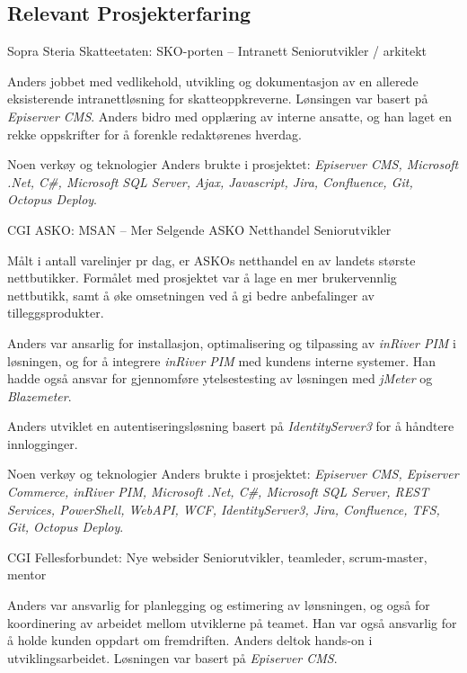 \documentclass[10pt]{article} %
\begin{document}
\begin{paracol}{2}

\section{Relevant Prosjekterfaring}


{Sopra Steria} %
{Skatteetaten: SKO-porten -- Intranett} 
{Seniorutvikler / arkitekt} 
{Anders jobbet med vedlikehold, utvikling og dokumentasjon av en allerede eksisterende intranettløsning for skatteoppkreverne. Lønsingen var basert på \textit{Episerver CMS}. Anders bidro med opplæring av interne ansatte, og han laget en rekke oppskrifter for å forenkle redaktørenes hverdag.

\qquad Noen verkøy og teknologier Anders brukte i prosjektet: \textit{Episerver CMS, Microsoft .Net, C\#, Microsoft SQL Server, Ajax, Javascript, Jira, Confluence, Git, Octopus Deploy}.} 

{CGI} %
{ASKO: MSAN -- Mer Selgende ASKO Netthandel} 
{Seniorutvikler} 
{Målt i antall varelinjer pr dag, er ASKOs netthandel en av landets største nettbutikker. Formålet med prosjektet var å lage en mer brukervennlig nettbutikk, samt å øke omsetningen ved å gi bedre anbefalinger av tilleggsprodukter.

\qquad Anders var ansarlig for installasjon, optimalisering og tilpassing av \textit{inRiver PIM} i løsningen, og for å integrere 
\textit{inRiver PIM} med kundens interne systemer. Han hadde også ansvar for gjennomføre ytelsestesting av løsningen 
med \textit{jMeter} og  \textit{Blazemeter}.

\qquad Anders utviklet en autentiseringsløsning basert på \textit{IdentityServer3}
for å håndtere innlogginger.

\qquad Noen verkøy og teknologier Anders brukte i prosjektet: \textit{Episerver CMS, Episerver Commerce, inRiver PIM, Microsoft .Net, C\#, Microsoft SQL Server, REST Services, PowerShell, WebAPI, WCF, IdentityServer3, Jira, Confluence, TFS, Git, Octopus Deploy}.} 


{CGI} 
{Fellesforbundet: Nye websider} 
{Seniorutvikler, teamleder, scrum-master, mentor} 
{Anders var ansvarlig for planlegging og estimering av lønsningen, og også for koordinering av arbeidet mellom utviklerne på teamet. 
Han var også ansvarlig for å holde kunden oppdart om fremdriften. Anders deltok hands-on i utviklingsarbeidet. Løsningen var basert
på \textit{Episerver CMS}.

}
\end{paracol}
\end{document}
